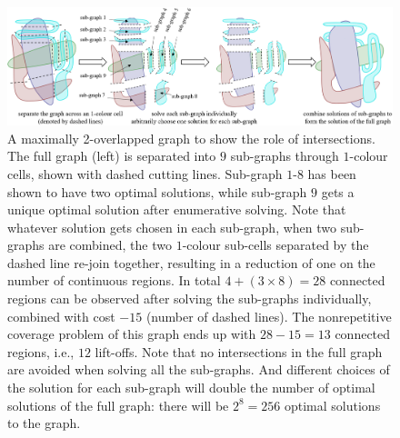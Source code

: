 \documentclass[conference]{IEEEtran}
\begin{document}
\begin{figure}[t]
\centering
\includegraphics[width=\textwidth]{figures/two_overlapped_graph_2}
\caption{A maximally 2-overlapped graph to show the role of intersections. The full graph (left) is separated into $9$ sub-graphs through $1$-colour cells, shown with dashed cutting lines. Sub-graph $1$-$8$ has been shown to have two optimal solutions, while sub-graph $9$ gets a unique optimal solution after enumerative solving. Note that whatever solution gets chosen in each sub-graph, when two sub-graphs are combined, the two $1$-colour sub-cells separated by the dashed line re-join together, resulting in a reduction of one on the number of continuous regions. In total $4+(3\times 8)=28$ connected regions can be observed after solving the sub-graphs individually, combined with cost $-15$ (number of dashed lines). The nonrepetitive coverage problem of this graph ends up with $28-15=13$ connected regions, i.e., $12$ lift-offs. 
Note that no intersections in the full graph are avoided when solving all the sub-graphs. And different choices of the solution for each sub-graph will double the number of optimal solutions of the full graph: there will be $2^8=256$ optimal solutions to the graph.
}
\label{fig:two_overlapped_graph}
\end{figure}
\end{document}
